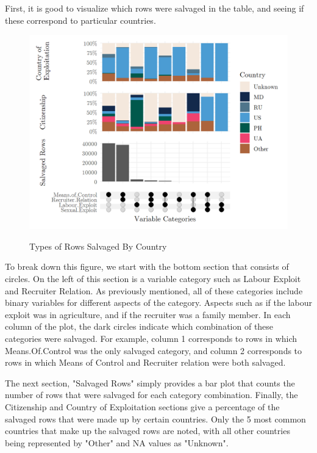 \documentclass{article} %
\begin{document}
First, it is good to visualize which rows were salvaged in the table, and seeing if these correspond to particular countries.

\FloatBarrier
\begin{figure}[H]
	\caption{Types of Rows Salvaged By Country}
	\includegraphics[width = \textwidth]{SalvageRowsUpset}
	\label{fig:SalvageByCountry}
\end{figure}
\FloatBarrier

To break down this figure, we start with the bottom section that consists of circles. On the left of this section is a variable category such as Labour Exploit and Recruiter Relation. As previously mentioned, all of these categories include binary variables for different aspects of the category. Aspects such as if the labour exploit was in agriculture, and if the recruiter was a family member. In each column of the plot, the dark circles indicate which combination of these categories were salvaged. For example, column 1 corresponds to rows in which Means.Of.Control was the only salvaged category, and column 2 corresponds to rows in which Means of Control and Recruiter relation were both salvaged.

The next section, "Salvaged Rows" simply provides a bar plot that counts the number of rows that were salvaged for each category combination. Finally, the Citizenship and Country of Exploitation sections give a percentage of the salvaged rows that were made up by certain countries. Only the 5 most common countries that make up the salvaged rows are noted, with all other countries being represented by "Other" and NA values as "Unknown".
\end{document}
